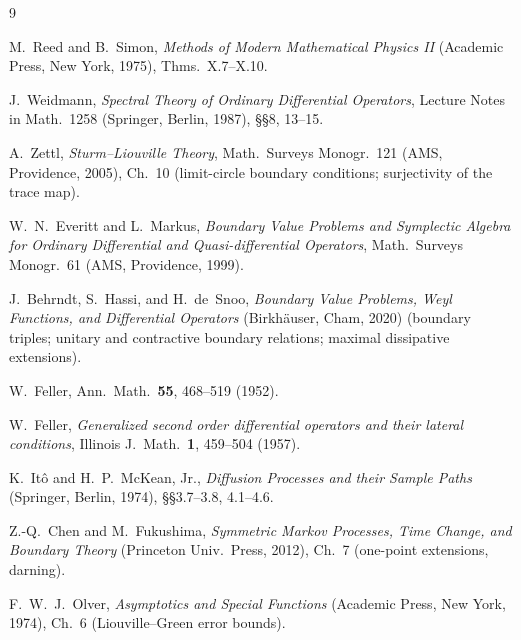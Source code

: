 \documentclass[11pt]{article}
\theoremstyle{remark}
\begin{document}
\begin{thebibliography}{9}

M.~Reed and B.~Simon,
\emph{Methods of Modern Mathematical Physics II}
(Academic Press, New York, 1975), Thms.~X.7--X.10.

J.~Weidmann,
\emph{Spectral Theory of Ordinary Differential Operators},
Lecture Notes in Math.~1258 (Springer, Berlin, 1987), \S\S8, 13--15.

A.~Zettl,
\emph{Sturm--Liouville Theory},
Math.\ Surveys Monogr.~121 (AMS, Providence, 2005), Ch.~10
(limit-circle boundary conditions; surjectivity of the trace map).

W.~N.~Everitt and L.~Markus,
\emph{Boundary Value Problems and Symplectic Algebra for Ordinary
Differential and Quasi-differential Operators},
Math.\ Surveys Monogr.~61 (AMS, Providence, 1999).

J.~Behrndt, S.~Hassi, and H.~de~Snoo,
\emph{Boundary Value Problems, Weyl Functions, and Differential
Operators} (Birkh\"auser, Cham, 2020) (boundary triples; unitary and
contractive boundary relations; maximal dissipative extensions).

W.~Feller,
Ann.\ Math.\ \textbf{55}, 468--519 (1952).

W.~Feller,
\emph{Generalized second order differential operators and their
lateral conditions},
Illinois J.\ Math.\ \textbf{1}, 459--504 (1957).

K.~It\^o and H.~P.~McKean, Jr.,
\emph{Diffusion Processes and their Sample Paths}
(Springer, Berlin, 1974), \S\S3.7--3.8, 4.1--4.6.

Z.-Q.~Chen and M.~Fukushima,
\emph{Symmetric Markov Processes, Time Change, and Boundary Theory}
(Princeton Univ.\ Press, 2012), Ch.~7 (one-point extensions,
darning).

F.~W.~J.~Olver,
\emph{Asymptotics and Special Functions}
(Academic Press, New York, 1974), Ch.~6 (Liouville--Green error
bounds).

\end{thebibliography}
\end{document}
